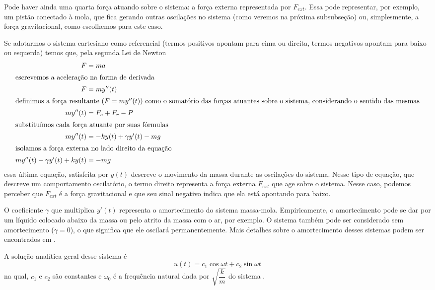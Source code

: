             Pode haver ainda uma quarta força atuando sobre o sistema: a força externa representada por $F_{ext}$. Essa pode representar, por exemplo, um pistão conectado à mola, que fica gerando outras oscilações no sistema (como veremos na próxima subsubseção) ou, simplesmente, a força gravitacional, como escolhemos para este caso.
            
            Se adotarmos o sistema cartesiano como referencial (termos positivos apontam para cima ou direita, termos negativos apontam para baixo ou esquerda) temos que, pela segunda Lei de Newton
            \begin{align}
                \label{Newton2}
                F &= ma\\
                \intertext{escrevemos a aceleração na forma de derivada}
                F &= my''(t)\\
                \intertext{definimos a força resultante ($F = my''(t)$) como o somatório das forças atuantes sobre o sistema, considerando o sentido das mesmas}
                my''(t) &= F_e + F_r - P\\
                \intertext{substituímos cada força atuante por suas fórmulas}
                \label{eqDifOsc}
                my''(t) &= -ky(t) + \gamma y'(t) - mg\\
                \intertext{isolamos a força externa no lado direito da equação}
                my''(t) - \gamma y'(t) + ky(t) &= -mg
            \end{align}
            essa última equação, satisfeita por $y(t)$ descreve o movimento da massa durante as oscilações do sistema. Nesse tipo de equação, que descreve um comportamento oscilatório, o termo direito representa a força externa $F_{ext}$ que age sobre o sistema. Nesse caso, podemos perceber que $F_{ext}$ é a força gravitacional e que seu sinal negativo indica que ela está apontando para baixo.
            
            O coeficiente $\gamma$ que multiplica $y'(t)$ representa o amortecimento do sistema massa-mola. Empiricamente, o amortecimento pode se dar por um líquido colocado abaixo da massa ou pelo atrito da massa com o ar, por exemplo. O sistema também pode ser considerado sem amortecimento ($\gamma = 0$), o que significa que ele oscilará permanentemente. Mais detalhes sobre o amortecimento desses sistemas podem ser encontrados em \cite{boyce9, regiIntro}.
            
            A solução analítica geral desse sistema é 
            \begin{equation}
                u(t) = c_1\cos{\omega t} + c_2\sin{\omega t}
            \end{equation}
            na qual, $c_1$ e $c_2$ são constantes e $\omega_0$ é a frequência natural dada por $\sqrt{\dfrac{k}{m}}$ do sistema \cite{regiIntro}.
            
